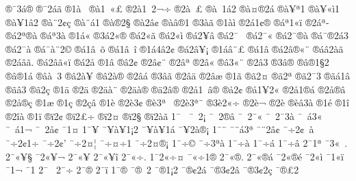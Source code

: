 {^^ae^^af3^^e1^^ae
^^ae^^af2^^e1^^e3
^^ae1^^e0^^a0
^^ae^^e01^^a0^^ab^^a3
^^ae2^^e01^^a02^^ac^^f7
^^ae2^^e0^^a0^^ad^^a3
^^ae^^e0^^a01^^e12
^^ae^^e0^^a4^^ae2^^e1
^^ae^^e0^^a5^^aa1
^^ae^^e0^^a5^^ab^^ec1
^^ae^^e0^^a51^^e22
^^ae^^e0^^a82^^a2^^e7
^^ae^^e0^^a8^^e11
^^ae^^e0^^ae2^^a7^^ad
^^ae^^e02^^e2^^a2
^^ae^^e0^^e2^^ae1
^^ae3^^e0^^e3
^^ae1^^e0^^ec
^^ae2^^e11^^a2^^ae
^^ae^^e1^^aa1^^ab^^ef
^^ae2^^e1^^aa^^ad
^^ae^^e12^^aa^^ae^^e0
^^ae^^e1^^aa3^^e0
^^ae1^^e1^^ab
^^ae3^^e12^^ab^^ae
^^ae^^e12^^ab^^e3
^^ae^^e12^^ab^^ec
^^ae^^e12^^ad^^a5^^e2
^^ae^^e12^^af^^a0
^^ae^^e12^^af^^ab
^^ae^^e12^^af^^ae^^e0
^^ae^^e1^^af^^ae2^^e13
^^ae^^e12^^af^^e0
^^ae^^e1^^af^^e0^^a82^^a9
^^ae^^e11^^e2^^a0^^f5
^^ae^^e11^^e2^^a0^^ee
^^ae1^^e14^^e22^^a2
^^ae^^e12^^e2^^a5^^a1
^^ae1^^e1^^e2^^a8^^a3
^^ae^^e11^^e2^^ad
^^ae^^e12^^e2^^ae^^ab^^a8
^^ae^^e1^^e22^^e0^^e3
^^ae2^^e1^^e2^^e3.
^^ae^^e12^^e2^^e3^^ab^^ef
^^ae^^e12^^e5
^^ae1^^e2
^^ae^^e22^^a2
^^ae2^^e2^^a2^^a8
^^ae2^^e2^^aa
^^ae2^^e2^^ab
^^ae^^e23^^ab^^a8
^^ae2^^e23^^ad
^^ae3^^e2^^ae
^^ae^^e2^^ae1^^a72
^^ae^^e2^^ae1^^e1
^^ae^^e2^^e0^^a0^^ad3
^^ae^^e22^^e0^^a5
^^ae^^e22^^e0^^ae
^^ae2^^e2^^e1
^^ae3^^e2^^e3
^^ae2^^e2^^e4
^^ae2^^e2^^e6
^^ae1^^e3
^^ae^^e32^^a4
^^ae^^e32^^aa
^^ae^^e32^^af3
^^ae^^e3^^e11^^e2
^^ae^^e3^^e23
^^ae^^e32^^e7
^^ae1^^e4
^^ae2^^e4^^ad
^^ae2^^e4^^e0^^a8
^^ae2^^e4^^e0^^ae
^^ae^^e42^^e2^^ae
^^ae2^^e51^^a0^^e2^^ae
^^ae^^e52^^a2
^^ae^^e51^^a52^^ab
^^ae2^^e51^^ae^^e1
^^ae2^^e5^^ae^^e2
^^ae2^^e5^^ae^^e7
^^ae1^^e6
^^ae1^^e7
^^ae2^^e7^^e2
^^ae1^^e8
^^ae2^^e83^^a2
^^ae^^e83^^aa^^a0
^^ae2^^e83^^aa^^a8
^^ae3^^e82^^ab^^f7
^^ae2^^e8^^ac
^^ae2^^e8^^ad
^^ae^^e8^^e23^^e0
^^ae1^^e9
^^ae1^^ee
^^ae2^^ee^^e0
^^ae1^^ef
^^ae^^ef2^^a2
^^ae^^ef2^^a3^^f7
^^ae^^ef2^^a4
^^ae^^ef2^^a7
^^ae^^ef2^^e0^^e3
1^^af^^a0
^^af^^a02^^a1
^^af^^a02^^ad^^ae^^e2
^^af^^a02^^af^^ab
^^af^^a02^^af3^^e0
^^af^^a0^^e13^^ab
^^af^^a0^^e11^^ac
^^af^^a02^^e5^^a2
^^af1^^a4
1^^af^^a5
^^af^^a5^^e0^^a51^^a12
^^af^^a5^^e0^^a51^^e1
^^af^^a52^^e0^^ae^^a1
1^^af^^a8
^^af^^a8^^e13^^aa
^^af^^a82^^e2^^a2
^^af^^f72^^a2^^a0^^e0
^^af^^f72^^a21^^f7
^^af^^f72^^a2'
^^af^^f72^^a4^^a6
^^af^^f7^^a4^^f71
^^af^^f72^^a4^^ae^^a1
1^^af^^f7^^a9
^^af^^f73^^aa^^e0
1^^af^^f7^^e0
1^^af^^f7^^e1
1^^af^^f7^^e2
2^^af1^^aa
^^af3^^ab^^a0.
2^^af^^ab^^a5^^a7
^^af2^^ab^^a5^^ac
2^^af^^ab^^a5^^ad
2^^af^^ab^^a5^^ee
2^^af^^ab^^f7.
1^^af2^^ab^^f7^^a4
^^af^^ab^^f71^^ae
2^^af^^ab^^ae.
2^^af^^ab^^ae^^e1
^^af2^^ab^^ae^^e9
^^af2^^ab^^ec
^^af1^^ab^^ef
^^af1^^ac
^^af1^^ad
2^^af^^ad^^a0
2^^af^^ad^^f7
2^^af^^ad^^ae
2^^af^^ad^^ef
1^^af^^ae
^^af^^ae^^a02
^^af^^ae1^^a12
^^af^^ae^^a22^^e1
^^af^^ae3^^a22^^e2
^^af^^ae3^^a22^^e7
^^af^^ae^^a32
}
